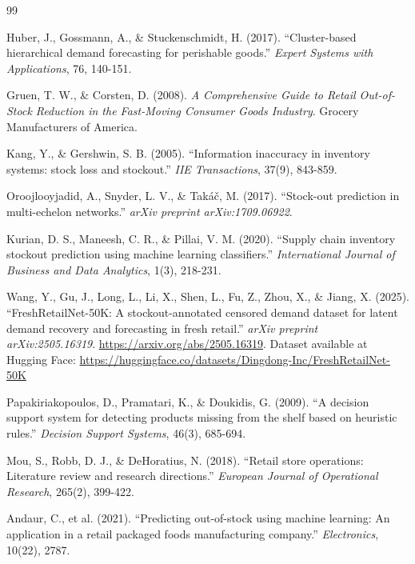 \documentclass[11pt, a4paper]{article}
\begin{document}

\begin{thebibliography}{99}

Huber, J., Gossmann, A., \& Stuckenschmidt, H. (2017). ``Cluster-based hierarchical demand forecasting for perishable goods.'' \textit{Expert Systems with Applications}, 76, 140-151.

Gruen, T. W., \& Corsten, D. (2008). \textit{A Comprehensive Guide to Retail Out-of-Stock Reduction in the Fast-Moving Consumer Goods Industry}. Grocery Manufacturers of America.

Kang, Y., \& Gershwin, S. B. (2005). ``Information inaccuracy in inventory systems: stock loss and stockout.'' \textit{IIE Transactions}, 37(9), 843-859.

Oroojlooyjadid, A., Snyder, L. V., \& Tak\'{a}\v{c}, M. (2017). ``Stock-out prediction in multi-echelon networks.'' \textit{arXiv preprint arXiv:1709.06922}.

Kurian, D. S., Maneesh, C. R., \& Pillai, V. M. (2020). ``Supply chain inventory stockout prediction using machine learning classifiers.'' \textit{International Journal of Business and Data Analytics}, 1(3), 218-231.

Wang, Y., Gu, J., Long, L., Li, X., Shen, L., Fu, Z., Zhou, X., \& Jiang, X. (2025). ``FreshRetailNet-50K: A stockout-annotated censored demand dataset for latent demand recovery and forecasting in fresh retail.'' \textit{arXiv preprint arXiv:2505.16319}. \url{https://arxiv.org/abs/2505.16319}. Dataset available at Hugging Face: \url{https://huggingface.co/datasets/Dingdong-Inc/FreshRetailNet-50K}

Papakiriakopoulos, D., Pramatari, K., \& Doukidis, G. (2009). ``A decision support system for detecting products missing from the shelf based on heuristic rules.'' \textit{Decision Support Systems}, 46(3), 685-694.

Mou, S., Robb, D. J., \& DeHoratius, N. (2018). ``Retail store operations: Literature review and research directions.'' \textit{European Journal of Operational Research}, 265(2), 399-422.

Andaur, C., et al. (2021). ``Predicting out-of-stock using machine learning: An application in a retail packaged foods manufacturing company.'' \textit{Electronics}, 10(22), 2787.


\end{thebibliography}
\end{document}
